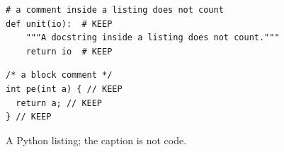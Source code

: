 \begin{figure}
\begin{verbatim}
# a comment inside a listing does not count
def unit(io):  # KEEP
    """A docstring inside a listing does not count."""
    return io  # KEEP
\end{verbatim}
\caption{A Python listing; the caption is not code.}
\begin{verbatim}
/* a block comment */
int pe(int a) { // KEEP
  return a; // KEEP
} // KEEP
\end{verbatim}
\end{figure}
